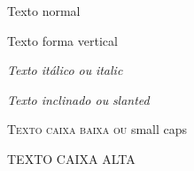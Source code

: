 \documentclass{article}
\begin{document}
Texto normal

\textup{Texto forma vertical}

\textit{Texto it\'alico ou } {\it italic}

\textsl{Texto inclinado ou } {\sl slanted}

\textsc{Texto caixa baixa ou } {\sc small caps}

\uppercase{Texto caixa alta}
\end{document}
